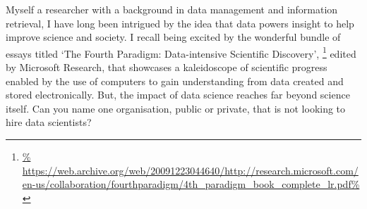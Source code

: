\documentclass[a4paper,twoside,12pt]{article}
\begin{document}
\newpage







Myself a researcher with a background in data management and information retrieval, I have long been intrigued by the idea that data powers insight to help improve science and society. I recall being excited by the wonderful bundle of essays titled `The Fourth Paradigm: Data-intensive Scientific Discovery',%
\footnote{\url{%
https://web.archive.org/web/20091223044640/http://research.microsoft.com/en-us/collaboration/fourthparadigm/4th_paradigm_book_complete_lr.pdf%
}}
edited by Microsoft Research, that showcases a kaleidoscope of scientific progress enabled by the use of computers to gain understanding from data created and stored electronically.
But, the impact of data science reaches far beyond science itself. Can you name one organisation, public or private, that is not looking to hire data scientists? 




\end{document}
